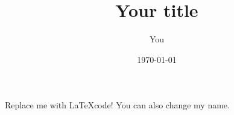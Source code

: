 \documentclass{article}
\title{Your title}
\author{You}
\date{\today}
\begin{document}
\maketitle

Replace me with \LaTeX code! You can also change my name.
\end{document}
